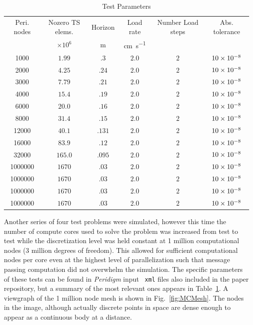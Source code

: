 \documentclass[preprint,12pt]{elsarticle}
\begin{document}
\begin{table}[!ht]    
  \scriptsize
  \centering
        \caption{Test Parameters} \label{tab:TestParams}   
       \begin{tabular}{c c c c c c}
         \toprule
         Peri. nodes & Nozero TS elems. & Horizon & Load rate & Number Load steps & Abs. tolerance \\ 
                     & $\times 10^6$    & \si{\meter}& \si{\centi\meter\per\second} &   &     \\
        \midrule
        1000 & $1.99$             & $.3$   & $2.0$ & $2$ & $\num{10E-8}$ \\
        2000 & $4.25$             & $.24$  & $2.0$ & $2$ & $\num{10E-8}$ \\
        3000 & $7.79$             & $.21$  & $2.0$ & $2$ & $\num{10E-8}$ \\
        4000 & $15.4$             & $.19$  & $2.0$ & $2$ & $\num{10E-8}$ \\
        6000 & $20.0$             & $.16$  & $2.0$ & $2$ & $\num{10E-8}$ \\
        8000 & $31.4$             & $.15$  & $2.0$ & $2$ & $\num{10E-8}$ \\
        12000 & $40.1$            & $.131$ & $2.0$ & $2$ & $\num{10E-8}$ \\
        16000 & $83.9$            & $.12$  & $2.0$ & $2$ & $\num{10E-8}$ \\
        32000 & $165.0$           & $.095$ & $2.0$ & $2$ & $\num{10E-8}$ \\
        1000000 & $1670$          & $.03$  & $2.0$ & $2$ & $\num{10E-8}$ \\
        1000000 & $1670$          & $.03$  & $2.0$ & $2$ & $\num{10E-8}$ \\
        1000000 & $1670$          & $.03$  & $2.0$ & $2$ & $\num{10E-8}$ \\
        1000000 & $1670$          & $.03$  & $2.0$ & $2$ & $\num{10E-8}$ \\
        \bottomrule
    \end{tabular}
\end{table}


Another series of four test problems were simulated, however this time the
number of compute cores used to solve the problem was increased from test to
test while the discretization level was held constant at 1 million
computational nodes (3 million degrees of freedom). This allowed for sufficient
computational nodes per core even at the highest level of parallelization such
that message passing computation did not overwhelm the simulation.  The
specific parameters of these tests can be found in \emph{Peridigm} input {\tt
xml} files also included in the paper repository, but a summary of the most relevant
ones appears in Table~\ref{tab:TestParams}. A viewgraph of the 1 million node mesh is
shown in Fig.~\ref{fig:MCMesh}. The nodes in the image, although actually discrete points
in space are dense enough to appear as a continuous body at a distance.
\end{document}
